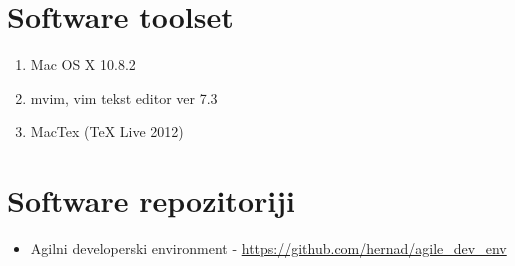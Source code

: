\documentclass[lmodern, utf8, zavrsni]{fit}
\begin{document}



\appendix

\chapter{Software toolset}
\begin{enumerate}
  \item Mac OS X 10.8.2
  \item mvim, vim tekst editor ver 7.3
  \item MacTex (TeX Live 2012)
\end{enumerate}

\chapter{Software repozitoriji}

\begin{itemize}
  \item Agilni developerski environment - \url{https://github.com/hernad/agile\_dev\_env}

\end{itemize}
\end{document}
